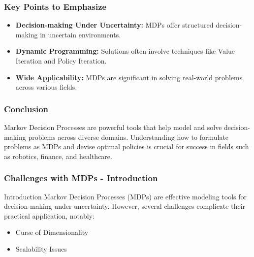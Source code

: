 \documentclass[aspectratio=169]{beamer}
\begin{document}
\begin{frame}[fragile]
    \frametitle{Key Points to Emphasize}
    \begin{itemize}
        \item \textbf{Decision-making Under Uncertainty:} MDPs offer structured decision-making in uncertain environments.
        \item \textbf{Dynamic Programming:} Solutions often involve techniques like Value Iteration and Policy Iteration.
        \item \textbf{Wide Applicability:} MDPs are significant in solving real-world problems across various fields.
    \end{itemize}
\end{frame}

\begin{frame}[fragile]
    \frametitle{Conclusion}
    Markov Decision Processes are powerful tools that help model and solve decision-making problems across diverse domains. Understanding how to formulate problems as MDPs and devise optimal policies is crucial for success in fields such as robotics, finance, and healthcare.
\end{frame}

\begin{frame}[fragile]
    \frametitle{Challenges with MDPs - Introduction}
    \begin{block}{Introduction}
        Markov Decision Processes (MDPs) are effective modeling tools for decision-making under uncertainty. However, several challenges complicate their practical application, notably:
    \end{block}
    \begin{itemize}
        \item Curse of Dimensionality
        \item Scalability Issues
    \end{itemize}
\end{frame}
\end{document}
